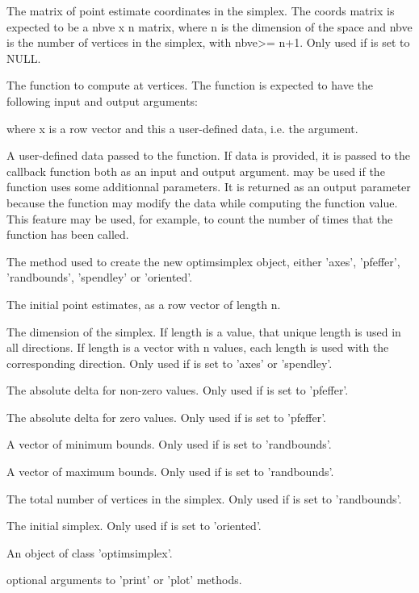 \begin{Arguments}
\begin{ldescription}
\item[\code{coords}] The matrix of point estimate coordinates in the simplex. The
coords matrix is expected to be a nbve x n matrix, where n is the dimension
of the space and nbve is the number of vertices in the simplex, with nbve>=
n+1. Only used if  is set to NULL.
\item[\code{fun}] The function to compute at vertices. The function is expected to
have the following input and output arguments:

where x is a row vector and this a user-defined data, i.e. the 
argument.
\item[\code{data}] A user-defined data passed to the function. If data is provided,
it is passed to the callback function both as an input and output argument.
 may be used if the function uses some additionnal parameters. It
is returned as an output parameter because the function may modify the data
while computing the function value. This feature may be used, for example,
to count the number of times that the function has been called.
\item[\code{method}] The method used to create the new optimsimplex object, either
'axes', 'pfeffer', 'randbounds', 'spendley' or 'oriented'.
\item[\code{x0}] The initial point estimates, as a row vector of length n.
\item[\code{len}] The dimension of the simplex. If length is a value, that unique
length is used in all directions. If length is a vector with n values, each
length is used with the corresponding direction. Only used if 
is set to 'axes' or 'spendley'.
\item[\code{deltausual}] The absolute delta for non-zero values. Only used if
 is set to 'pfeffer'.
\item[\code{deltazero}] The absolute delta for zero values. Only used if
 is set to 'pfeffer'.
\item[\code{boundsmin}] A vector of minimum bounds. Only used if  is
set to 'randbounds'.
\item[\code{boundsmax}] A vector of maximum bounds. Only used if  is
set to 'randbounds'.
\item[\code{nbve}] The total number of vertices in the simplex. Only used if
 is set to 'randbounds'.
\item[\code{simplex0}] The initial simplex. Only used if  is set to
'oriented'.
\item[\code{x}] An object of class 'optimsimplex'.
\item[\code{...}] optional arguments to 'print' or 'plot' methods.
\end{ldescription}
\end{Arguments}
